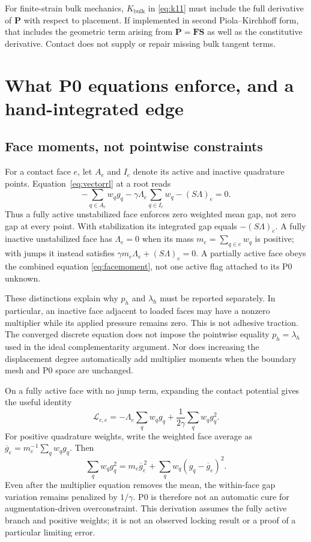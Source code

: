 \documentclass[preprint,11pt]{elsarticle}
\numberwithin{equation}{section}
\newcommand{\bP}{\boldsymbol{P}}
\newcommand{\bF}{\boldsymbol{F}}
\newcommand{\bS}{\boldsymbol{S}}
\begin{document}
For finite-strain bulk mechanics, $K_{\mathrm{bulk}}$ in
\eqref{eq:k11} must include the full derivative of $\bP$ with respect
to placement. If implemented in second Piola--Kirchhoff form, that
includes the geometric term arising from $\bP=\bF\bS$ as well as
the constitutive derivative. Contact does not supply or repair missing
bulk tangent terms.

\section{What P0 equations enforce, and a hand-integrated edge}
\label{sec:moments}

\subsection{Face moments, not pointwise constraints}
For a contact face $e$, let $A_e$ and $I_e$ denote its active and inactive
quadrature points. Equation~\eqref{eq:vectorrl} at a root reads
\begin{equation}
 -\sum_{q\in A_e}w_qg_q
 -\gamma\Lambda_e\sum_{q\in I_e}w_q
 -(S\Lambda)_e=0.
 \label{eq:facemoment}
\end{equation}
Thus a fully active unstabilized face enforces zero weighted mean gap,
not zero gap at every point. With stabilization its integrated gap equals
$-(S\Lambda)_e$. A fully inactive unstabilized face has $\Lambda_e=0$
when its mass $m_e=\sum_{q\in e}w_q$ is positive; with jumps it instead
satisfies $\gamma m_e\Lambda_e+(S\Lambda)_e=0$.
A partially active face obeys the combined equation
\eqref{eq:facemoment}, not one active flag attached to its P0 unknown.

These distinctions explain why $p_h$ and $\lambda_h$ must be reported
separately. In particular, an inactive face adjacent to loaded faces may
have a nonzero multiplier while its applied pressure remains zero. This
is not adhesive traction. The converged discrete equation does not impose
the pointwise equality $p_h=\lambda_h$ used in the ideal complementarity
argument. Nor does increasing the displacement degree automatically add
multiplier moments when the boundary mesh and P0 space are unchanged.

On a fully active face with no jump term, expanding the contact potential
gives the useful identity
\begin{equation}
 \mathcal L_{c,e}=-\Lambda_e\sum_q w_qg_q
                 +\frac1{2\gamma}\sum_qw_qg_q^2.
 \label{eq:activepotential}
\end{equation}
For positive quadrature weights, write the weighted face average as
$\overline g_e=m_e^{-1}\sum_qw_qg_q$. Then
\begin{equation}
 \sum_qw_qg_q^2=m_e\overline g_e^{\,2}
                 +\sum_qw_q(g_q-\overline g_e)^2.
 \label{eq:gapvariance}
\end{equation}
Even after the multiplier equation removes the mean, the within-face
gap variation remains penalized by $1/\gamma$. P0 is therefore not an
automatic cure for augmentation-driven overconstraint. This derivation
assumes the fully active branch and positive weights; it is not an observed
locking result or a proof of a particular limiting error.
\end{document}
